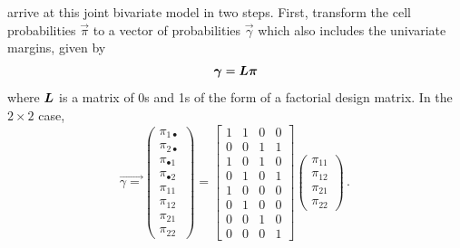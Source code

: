 \documentclass[11pt]{book}\usepackage[]{graphicx}\usepackage[]{color}
\begin{document}
\citet{McCullaghNelder:89} arrive at this joint bivariate model in two steps.
First, transform the cell probabilities $\vec{\pi}$
to a vector of probabilities $\vec{\gamma}$ which also includes the
univariate margins, given by
\begin{equation}\label{eq:gamma1}
\bm{\gamma} = \bm{L} \bm{\pi}
\end{equation}
where $\bm{L}$ is a matrix of 0s and 1s of the form of a factorial
design matrix. In the $2\times 2$ case,
\begin{equation}\label{eq:gamma2}
\vec{\gamma =}\left(
\begin{array}{c}
\pi _{1\bullet } \\
\pi _{2\bullet } \\
\pi _{\bullet 1} \\
\pi _{\bullet 2} \\
\pi _{11} \\
\pi _{12} \\
\pi _{21} \\
\pi _{22}
\end{array}
\right) =\left[
\begin{array}{cccc}
1 & 1 & 0 & 0 \\
0 & 0 & 1 & 1 \\
1 & 0 & 1 & 0 \\
0 & 1 & 0 & 1 \\
1 & 0 & 0 & 0 \\
0 & 1 & 0 & 0 \\
0 & 0 & 1 & 0 \\
0 & 0 & 0 & 1
\end{array}
\right] \left(
\begin{array}{c}
\pi _{11} \\
\pi _{12} \\
\pi _{21} \\
\pi _{22}
\end{array}
\right) \period
\end{equation}
\end{document}
